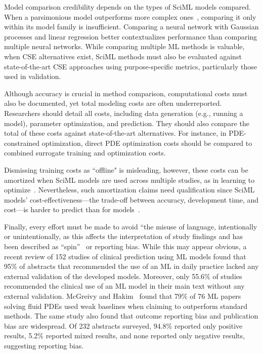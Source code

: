Model comparison credibility depends on the types of SciML models compared. When a parsimonious model outperforms more complex ones~\cite{Tiantian_etal_WR_2017}, comparing it only within its model family is insufficient. Comparing a neural network with Gaussian processes and linear regression better contextualizes performance than comparing multiple neural networks. While comparing multiple ML methods is valuable, when CSE alternatives exist, SciML methods must also be evaluated against state-of-the-art CSE approaches using purpose-specific metrics, particularly those used in validation.

Although accuracy is crucial in method comparison, computational costs must also be documented, yet total modeling costs are often underreported. Researchers should detail all costs, including data generation (e.g., running a \CSE{} model), parameter optimization, and prediction.
They should also compare the total of these costs against state-of-the-art alternatives. For instance, in PDE-constrained optimization, direct PDE optimization costs should be compared to combined surrogate training and optimization costs. 

Dismissing training costs as ``offline" is misleading, however, these costs can be amortized when SciML models are used across multiple studies, as in learning to optimize~\cite{chen2022learning}. Nevertheless, such amortization claims need qualification since SciML models' cost-effectiveness---the trade-off between accuracy, development time, and cost---is harder to predict than for \CSE{} models~\cite{Sculley_etal_Neurips_2015}.


Finally, every effort must be made to avoid ``the misuse of language, intentionally or unintentionally, as this affects the interpretation of study findings and has been described as ``spin''~\cite{Constanza_et_al_JCE_2023} or reporting bias. While this may appear obvious, a recent review of 152 studies of clinical prediction using ML models found that 95\% of abstracts that recommended the use of an ML in daily practice lacked any external validation of the developed models. Moreover, only 55.6\% of studies recommended the clinical use of an ML model in their main text without any external validation. McGreivy and Hakim~\cite{Mcgreivy_H_arxiv_2024} found that 79\% of 76 ML papers solving fluid PDEs used weak baselines when claiming to outperform standard methods. The same study also found that outcome reporting bias and publication bias are widespread. 
Of 232 abstracts surveyed, 94.8\% reported only positive results, 5.2\% reported mixed results, and none reported only negative results, suggesting reporting bias.


